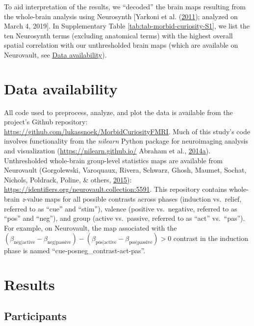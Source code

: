 \documentclass[11pt,american,]{memoir} %
\begin{document}
To aid interpretation of the results, we ``decoded'' the brain maps resulting from the whole-brain analysis using Neurosynth {[}Yarkoni et al. (\protect\hyperlink{ref-yarkoni2011large}{2011}); analyzed on March 4, 2019{]}. In Supplementary Table \ref{tab:tab-morbid-curiosity-S1}, we list the ten Neurosynth terms (excluding anatomical terms) with the highest overall spatial correlation with our unthresholded brain maps (which are available on Neurovault, see \protect\hyperlink{morbid-curiosity-data-availability}{Data availability}).

\hypertarget{morbid-curiosity-data-availability}{%
\section{Data availability}\label{morbid-curiosity-data-availability}}

All code used to preprocess, analyze, and plot the data is available from the project's Github repository: \url{https://github.com/lukassnoek/MorbidCuriosityFMRI}. Much of this study's code involves functionality from the \emph{nilearn} Python package for neuroimaging analysis and visualization (\url{https://nilearn.github.io/} Abraham et al., \protect\hyperlink{ref-abraham2014machine}{2014}\protect\hyperlink{ref-abraham2014machine}{a}). Unthresholded whole-brain group-level statistics maps are available from Neurovault (Gorgolewski, Varoquaux, Rivera, Schwarz, Ghosh, Maumet, Sochat, Nichols, Poldrack, Poline, \& others, \protect\hyperlink{ref-gorgolewski2015neurovault}{2015}): \url{https://identifiers.org/neurovault.collection:5591}. This repository contains whole-brain \emph{z}-value maps for all possible contrasts across phases (induction vs.~relief, referred to as ``cue'' and ``stim''), valence (positive vs.~negative, referred to as ``pos'' and ``neg''), and group (active vs.~passive, referred to as ``act'' vs.~``pas''). For example, on Neurovault, the map associated with the \((\beta_{\mathrm{neg | active}} - \beta_{\mathrm{neg | passive}}) - (\beta_{\mathrm{pos | active}} - \beta_{\mathrm{pos | passive}}) > 0\) contrast in the induction phase is named ``cue-posneg\_contrast-act-pas''.

\hypertarget{morbid-curiosity-results}{%
\section{Results}\label{morbid-curiosity-results}}

\hypertarget{morbid-curiosity-results-participants}{%
\subsection{Participants}\label{morbid-curiosity-results-participants}}
\end{document}
